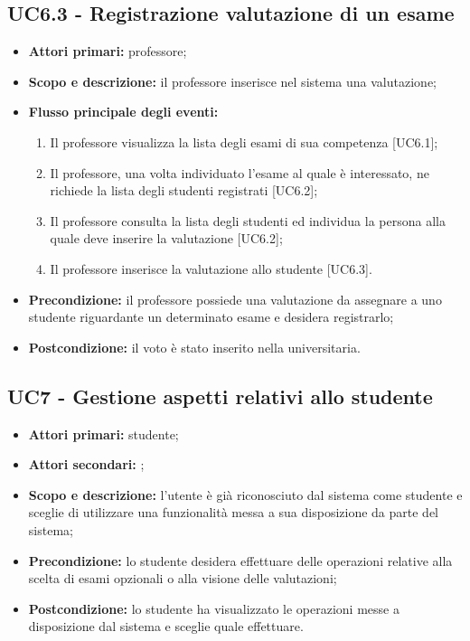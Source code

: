 \documentclass[AnalisiDeiRequisiti.tex]{subfiles}
\begin{document}
\subsection{UC6.3 - Registrazione valutazione di un esame}
\begin{itemize}
	\item \textbf{Attori primari:} professore;
	\item \textbf{Scopo e descrizione:} il professore inserisce nel sistema una valutazione;
	\item \textbf{Flusso principale degli eventi:}
	\begin{enumerate}
		\item Il professore visualizza la lista degli esami di sua competenza [UC6.1];
		\item Il professore, una volta individuato l'esame al quale è interessato, ne richiede la lista degli studenti registrati [UC6.2];
		\item Il professore consulta la lista degli studenti ed individua la persona alla quale deve inserire la valutazione [UC6.2];
		\item Il professore inserisce la valutazione allo studente [UC6.3].
	\end{enumerate}
	\item \textbf{Precondizione:} il professore possiede una valutazione da assegnare a uno studente riguardante un determinato esame e desidera registrarlo;
	\item \textbf{Postcondizione:} il voto è stato inserito nella  universitaria.
\end{itemize}


\subsection{UC7 - Gestione aspetti relativi allo studente}
\begin{itemize}
	\item \textbf{Attori primari:} studente;
	\item \textbf{Attori secondari:} ;
	\item \textbf{Scopo e descrizione:} l'utente è già riconosciuto dal sistema come studente e sceglie di utilizzare una funzionalità messa a sua disposizione da parte del sistema;
	\item \textbf{Precondizione:} lo studente desidera effettuare delle operazioni relative alla scelta di esami opzionali o alla visione delle valutazioni;
	\item \textbf{Postcondizione:} lo studente ha visualizzato le operazioni messe a disposizione dal sistema e sceglie quale effettuare.
\end{itemize}
\end{document}

